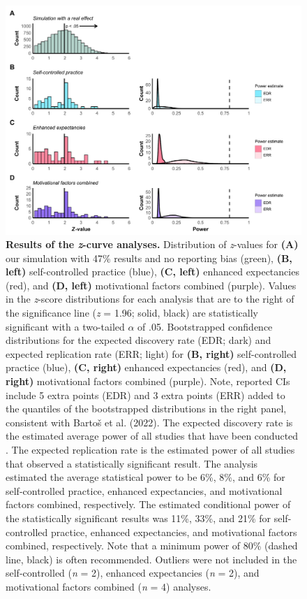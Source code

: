 \documentclass[
  doc, donotrepeattitle,floatsintext]{apa7}
\begin{document}
\clearpage

\begin{figure}

{\centering \includegraphics{../../figs/fig3} 

}

\caption{\normalfont \footnotesize \textbf{Results of the \emph{z}-curve analyses.} Distribution of \emph{z}-values for \textbf{(A)} our simulation with 47\% results and no reporting bias (green), \textbf{(B, left)} self-controlled practice (blue), \textbf{(C, left)} enhanced expectancies (red), and \textbf{(D, left)} motivational factors combined (purple). Values in the \emph{z}-score distributions for each analysis that are to the right of the significance line (\emph{z} = 1.96; solid, black) are statistically significant with a two-tailed \(\alpha\) of .05. Bootstrapped confidence distributions for the expected discovery rate (EDR; dark) and expected replication rate (ERR; light) for \textbf{(B, right)} self-controlled practice (blue), \textbf{(C, right)} enhanced expectancies (red), and \textbf{(D, right)} motivational factors combined (purple). Note, reported CIs include 5 extra points (EDR) and 3 extra points (ERR) added to the quantiles of the bootstrapped distributions in the right panel, consistent with Bartoš et al. (2022). The expected discovery rate is the estimated average power of all studies that have been conducted . The expected replication rate is the estimated power of all studies that observed a statistically significant result. The analysis estimated the average statistical power to be 6\%, 8\%, and 6\% for self-controlled practice, enhanced expectancies, and motivational factors combined, respectively. The estimated conditional power of the statistically significant results was 11\%, 33\%, and 21\% for self-controlled practice, enhanced expectancies, and motivational factors combined, respectively. Note that a minimum power of 80\% (dashed line, black) is often recommended. Outliers were not included in the self-controlled (\emph{n} = 2), enhanced expectancies (\emph{n} = 2), and motivational factors combined (\emph{n} = 4) analyses.}\label{fig:fig3}
\end{figure}
\end{document}
